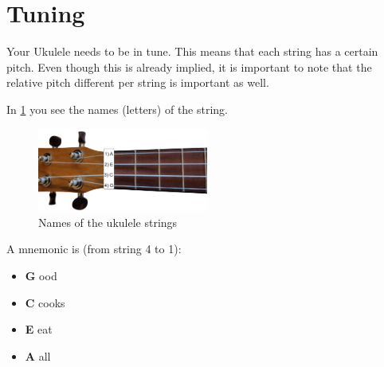 \section{Tuning}

Your Ukulele needs to be in tune. This means that each string has a certain pitch. Even though this is already implied, it is important to note that the relative pitch different per string is important as well.

In \ref{fig:ukulele_string_names} you see the names (letters) of the string.

\begin{figure}[h]
    \centering
    \includegraphics[width=0.5\textwidth]{../../Images/UkuleleNeck-StringNames.png}
    \caption{Names of the ukulele strings}
    \label{fig:ukulele_string_names}
\end{figure}

A mnemonic is (from string 4 to 1):

\begin{itemize}
	\setlength\itemsep{0em}
	\item[4)] \textbf{G} ood
	\item[3)] \textbf{C} cooks
	\item[2)] \textbf{E} eat
	\item[1)] \textbf{A} all 
\end{itemize}


